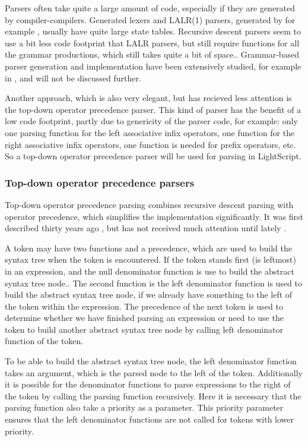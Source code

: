 \documentclass[11pt]{report}
\begin{document}
Parsers often take quite a large amount of code, especially if they are generated by compiler-compilers.
Generated lexers and LALR(1) parsers, generated by for example \cite{yacc, yacc2}, usually have quite large state tables.
Recursive descent parsers seem to use a bit less code footprint that LALR parsers, but still require functions for all the grammar productions, which still takes quite a bit of space..
Grammar-based parser generation and implementation have been extensively studied, for example in  \cite{basics-of-compiler-design, grammar}, and will not be discussed further.

Another approach, which is also very elegant, 
but has recieved less attention is the
top-down operator precedence parser.
This kind of parser has the benefit of a low code footprint,
partly due to genericity of the parser code,
for example: only one parsing
function for the left associative infix operators,
one function for the right associative infix operators,
one function is needed for prefix operators, etc.
So a top-down operator precedence parser will be used for parsing in LightScript.

\subsubsection{Top-down operator precedence parsers}
\label{tdop}
Top-down operator precedence parsing combines recursive descent parsing with operator precedence, which simplifies the implementation significantly.
It was first described thirty years ago \cite{top-down-operator-precedence}, but has not received much attention until lately \cite{beautiful-code, crockford-tdop}.


A token may have two functions and a precedence, which are used to build the syntax tree when the token is encountered.
If the token stands first (is leftmost) in an expression, and the null denominator function is use to build the abstract syntax tree node..
The second function is the left denominator function is used to build the abstract syntax tree node, if we already have something to the left of the token within the expression.
The precedence of the next token is used to determine whether we have finished parsing an expression or need to use the token to build another abstract syntax tree node by calling left denominator function of the token.

To be able to build the abstract syntax tree node, the left denominator function takes an argument, which is the parsed node to the left of the token. Additionally it is possible for the denominator functions to parse expressions to the right of the token by calling the parsing function recursively. Here it is necessary that the parsing function also take a priority as a parameter. This priority parameter ensures that the left denominator functions are not called for tokens with lower priority.
\end{document}

